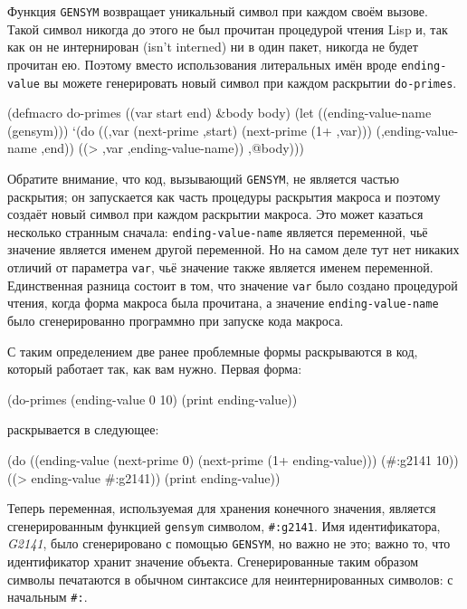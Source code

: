 Функция \lstinline{GENSYM} возвращает уникальный символ при каждом своём вызове. Такой символ
никогда до этого не был прочитан процедурой чтения Lisp и, так как он не интернирован
(isn't interned) ни в один пакет, никогда не будет прочитан ею. Поэтому вместо
использования литеральных имён вроде \lstinline{ending-value} вы можете генерировать новый
символ при каждом раскрытии \lstinline{do-primes}.

\begin{myverb}
(defmacro do-primes ((var start end) &body body)
  (let ((ending-value-name (gensym)))
    `(do ((,var (next-prime ,start) (next-prime (1+ ,var)))
          (,ending-value-name ,end))
         ((> ,var ,ending-value-name))
       ,@body)))
\end{myverb}

Обратите внимание, что код, вызывающий \lstinline{GENSYM}, не является частью раскрытия; он
запускается как часть процедуры раскрытия макроса и поэтому создаёт новый символ при
каждом раскрытии макроса. Это может казаться несколько странным сначала:
\lstinline{ending-value-name} является переменной, чьё значение является именем другой
переменной. Но на самом деле тут нет никаких отличий от параметра \lstinline{var}, чьё значение
также является именем переменной. Единственная разница состоит в том, что значение
\lstinline{var} было создано процедурой чтения, когда форма макроса была прочитана, а значение
\lstinline{ending-value-name} было сгенерированно программно при запуске кода макроса.

С таким определением две ранее проблемные формы раскрываются в код, который работает так,
как вам нужно. Первая форма:

\begin{myverb}
(do-primes (ending-value 0 10)
  (print ending-value))
\end{myverb}

\noindent{}раскрывается в следующее:

\begin{myverb}
(do ((ending-value (next-prime 0) (next-prime (1+ ending-value)))
     (#:g2141 10))
    ((> ending-value #:g2141))
  (print ending-value))
\end{myverb}

Теперь переменная, используемая для хранения конечного значения, является сгенерированным
функцией \lstinline{gensym} символом, \lstinline!#:g2141!. Имя идентификатора, \textit{G2141},
было сгенерировано с помощью \lstinline{GENSYM}, но важно не это; важно то, что идентификатор
хранит значение объекта. Сгенерированные таким образом символы печатаются в обычном
синтаксисе для неинтернированных символов: с начальным \lstinline!#:!.

